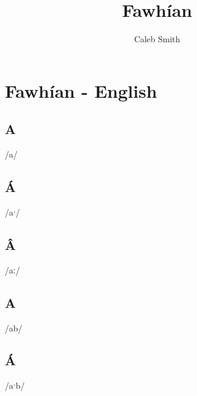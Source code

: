 \documentclass[10pt,a4paper,twoside]{book}
\title{Fawhían}
\author{Caleb Smith} %
\begin{document}




\chapter{Fawhían - English}


\section*{A}

\begin{multicols}{3}
 {/a/} {}
\end{multicols}

\section*{Á}

\begin{multicols}{3}
 {/aˑ/} {}
\end{multicols}

\section*{Â}

\begin{multicols}{3}
 {/aː/} {}
\end{multicols}

\section*{A}

\begin{multicols}{3}
 {/ab/} {}
\end{multicols}

\section*{Á}

\begin{multicols}{3}
 {/aˑb/} {}
\end{multicols}
\end{document}
